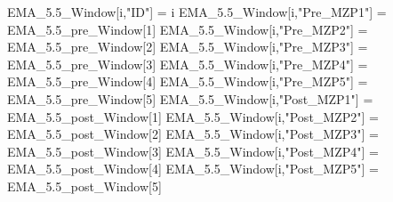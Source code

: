 \documentclass[12pt,twoside]{reedthesis}
\newenvironment{Shaded}{\begin{snugshade}}{\end{snugshade}}
\newcommand{\DecValTok}[1]{\textcolor[rgb]{0.00,0.00,0.81}{#1}}
\newcommand{\FloatTok}[1]{\textcolor[rgb]{0.00,0.00,0.81}{#1}}
\newcommand{\NormalTok}[1]{#1}
\newcommand{\StringTok}[1]{\textcolor[rgb]{0.31,0.60,0.02}{#1}}
\begin{document}
\begin{Shaded}
\begin{Highlighting}[]
\NormalTok{  EMA_}\FloatTok{5.5}\NormalTok{_Window[i,}\StringTok{"ID"}\NormalTok{] =}\StringTok{ }\NormalTok{i}
\NormalTok{  EMA_}\FloatTok{5.5}\NormalTok{_Window[i,}\StringTok{"Pre_MZP1"}\NormalTok{] =}\StringTok{ }\NormalTok{EMA_}\FloatTok{5.5}\NormalTok{_pre_Window[}\DecValTok{1}\NormalTok{]}
\NormalTok{  EMA_}\FloatTok{5.5}\NormalTok{_Window[i,}\StringTok{"Pre_MZP2"}\NormalTok{] =}\StringTok{ }\NormalTok{EMA_}\FloatTok{5.5}\NormalTok{_pre_Window[}\DecValTok{2}\NormalTok{]}
\NormalTok{  EMA_}\FloatTok{5.5}\NormalTok{_Window[i,}\StringTok{"Pre_MZP3"}\NormalTok{] =}\StringTok{ }\NormalTok{EMA_}\FloatTok{5.5}\NormalTok{_pre_Window[}\DecValTok{3}\NormalTok{]}
\NormalTok{  EMA_}\FloatTok{5.5}\NormalTok{_Window[i,}\StringTok{"Pre_MZP4"}\NormalTok{] =}\StringTok{ }\NormalTok{EMA_}\FloatTok{5.5}\NormalTok{_pre_Window[}\DecValTok{4}\NormalTok{]}
\NormalTok{  EMA_}\FloatTok{5.5}\NormalTok{_Window[i,}\StringTok{"Pre_MZP5"}\NormalTok{] =}\StringTok{ }\NormalTok{EMA_}\FloatTok{5.5}\NormalTok{_pre_Window[}\DecValTok{5}\NormalTok{]}
\NormalTok{  EMA_}\FloatTok{5.5}\NormalTok{_Window[i,}\StringTok{"Post_MZP1"}\NormalTok{] =}\StringTok{ }\NormalTok{EMA_}\FloatTok{5.5}\NormalTok{_post_Window[}\DecValTok{1}\NormalTok{]}
\NormalTok{  EMA_}\FloatTok{5.5}\NormalTok{_Window[i,}\StringTok{"Post_MZP2"}\NormalTok{] =}\StringTok{ }\NormalTok{EMA_}\FloatTok{5.5}\NormalTok{_post_Window[}\DecValTok{2}\NormalTok{]}
\NormalTok{  EMA_}\FloatTok{5.5}\NormalTok{_Window[i,}\StringTok{"Post_MZP3"}\NormalTok{] =}\StringTok{ }\NormalTok{EMA_}\FloatTok{5.5}\NormalTok{_post_Window[}\DecValTok{3}\NormalTok{]}
\NormalTok{  EMA_}\FloatTok{5.5}\NormalTok{_Window[i,}\StringTok{"Post_MZP4"}\NormalTok{] =}\StringTok{ }\NormalTok{EMA_}\FloatTok{5.5}\NormalTok{_post_Window[}\DecValTok{4}\NormalTok{]}
\NormalTok{  EMA_}\FloatTok{5.5}\NormalTok{_Window[i,}\StringTok{"Post_MZP5"}\NormalTok{] =}\StringTok{ }\NormalTok{EMA_}\FloatTok{5.5}\NormalTok{_post_Window[}\DecValTok{5}\NormalTok{]}
  

\end{Highlighting}
\end{Shaded}
\end{document}
